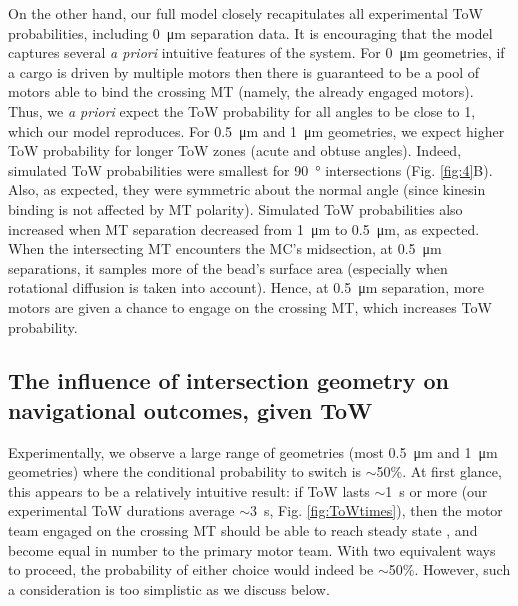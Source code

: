On the other hand, our full model closely recapitulates all experimental ToW probabilities, including \SI{0}{\micro\meter} separation data. It is encouraging that the model captures several \textit{a priori} intuitive features of the system. For \SI{0}{\micro\meter} geometries, if a cargo is driven by multiple motors then there is guaranteed to be a pool of motors able to bind the crossing MT (namely, the already engaged motors). Thus, we \textit{a priori} expect the ToW probability for all angles to be close to 1, which our model reproduces. For \SI{.5}{\micro\meter} and \SI{1}{\micro\meter} geometries, we expect higher ToW probability for longer ToW zones (acute and obtuse angles). Indeed, simulated ToW probabilities were smallest for \SI{90}{\degree} intersections (Fig. \ref{fig:4}B). Also, as expected, they were symmetric about the normal angle (since kinesin binding is not affected by MT polarity). Simulated ToW probabilities also increased when MT separation decreased from \SI{1}{\micro\meter} to \SI{.5}{\micro\meter}, as expected. When the intersecting MT encounters the MC's midsection, at \SI{.5}{\micro\meter} separations, it samples more of the bead's surface area (especially when rotational diffusion is taken into account). Hence, at \SI{.5}{\micro\meter} separation, more motors are given a chance to engage on the crossing MT, which increases ToW probability.

\subsection{The influence of intersection geometry on navigational outcomes, given ToW}

Experimentally, we observe a large range of geometries (most \SI{.5}{\micro\meter} and \SI{1}{\micro\meter} geometries) where the conditional probability to switch is $\sim$50\%. At first glance, this appears to be a relatively intuitive result: if ToW lasts $\sim$\SI{1}{\second} or more (our experimental ToW durations average $\sim$\SI{3}{\second}, Fig. \ref{fig:ToWtimes}), then the motor team engaged on the crossing MT should be able to reach steady state \cite{Erickson2011}, and become equal in number to the primary motor team. With two equivalent ways to proceed, the probability of either choice would indeed be $\sim$50\%. However, such a consideration is too simplistic as we discuss below.

